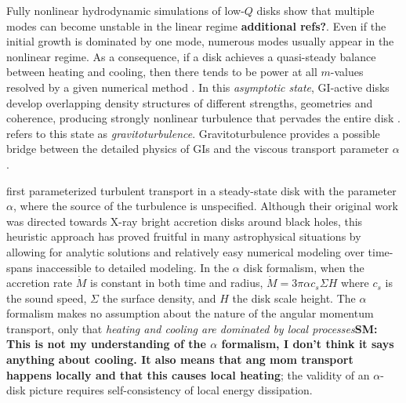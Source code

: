 \documentclass[manuscript]{aastex} %
\begin{document}
Fully nonlinear hydrodynamic simulations of low-$Q$ disks show that multiple
modes can become unstable in the linear regime \citep[e.g.][]{nelson1998, pickett1998} {\bf additional refs?}.  Even if the initial growth is dominated by one mode, numerous modes usually appear in the nonlinear regime. As a consequence, if a disk achieves a quasi-steady balance between heating and cooling, then there tends to be power at all $m$-values resolved by a given numerical method \citep{mejia2005,boley2006}.  
In this  {\it asymptotic state}, GI-active disks develop overlapping density structures of different strengths, geometries and coherence, producing strongly nonlinear turbulence that pervades the entire disk \citep[e.g.][]{pickett2003, mejia2005,boley2006}.
\citet{gammie2001} refers to this state as {\it gravitoturbulence}. Gravitoturbulence provides a possible bridge between the detailed physics of GIs and the viscous transport parameter $\alpha$. 

\citet{shakura1973} first parameterized turbulent transport in a steady-state disk with the  parameter $\alpha$, where the source of the turbulence is unspecified. Although their original work was directed towards X-ray bright
accretion disks around black holes, this heuristic approach has proved fruitful in many astrophysical situations by allowing for analytic solutions and relatively easy numerical modeling over time-spans inaccessible to detailed modeling. In the $\alpha$ disk formalism, when the accretion rate $\dot{M}$ is constant in both time and radius, $\dot{M} = 3\pi\alpha c_s \Sigma H$ where $c_s$ is the sound speed, $\Sigma$ the surface density, and $H$ the disk scale height. The $\alpha$ formalism makes no assumption about the nature of the angular momentum transport, only that {\it heating and cooling are dominated by local processes}{\bf SM: This is not my understanding of the $\alpha$ formalism, I don't think it says anything about cooling. It also means that ang mom transport happens locally and that this causes local heating}; the validity of an $\alpha$-disk picture requires self-consistency of local energy dissipation. 
\end{document}
